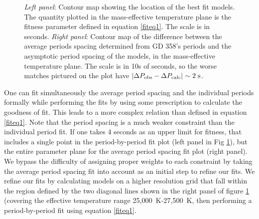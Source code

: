 \documentclass[12pt,preprint]{aastex}
\begin{document}
\begin{figure}
\caption{
{\it Left panel}: Contour map showing the location of the best fit models. The quantity plotted in 
the mass-effective temperature plane is the fitness parameter defined in equation \ref{fiteq1}. 
The scale is in seconds. {\it Right panel}: Contour map of the difference between the average 
periods spacing determined from GD 358's periods and the asymptotic period spacing of the models, 
in the mass-effective temperature plane. The scale is in 10s of seconds, so the worse matches 
pictured on the plot have $\left|\Delta P_{\rm obs}- \Delta P_{\rm calc}\right| \sim 2 \; \rm s$. \label{ffit2}
}
\end{figure}

One can fit simultaneously the average period spacing and the individual periods 
formally while performing the fits by using some prescription to calculate the goodness of fit. 
This leads to a more complex relation than defined in equation \ref{fiteq1}. 
Note that the period spacing is a much weaker constraint than the individual period fit. 
If one takes 4 seconds as an upper limit for fitness, that includes a single point in the 
period-by-period fit plot (left panel in Fig \ref{ffit2}), but the entire parameter plane 
for the average period spacing fit plot (right panel). We bypass the difficulty of 
assigning proper weights to each constraint by taking the average period spacing fit into 
account as an initial step to refine our fits. We refine our fits by calculating models on 
a higher resolution grid that fall within the region defined by the two diagonal lines shown 
in the right panel of figure \ref{ffit2} (covering the effective temperature range 25,000~K-27,500~K, then performing a period-by-period fit using 
equation \ref{fiteq1}.

\end{document}
